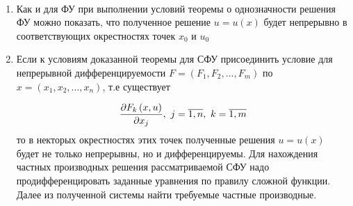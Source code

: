 \documentclass[../../main.tex]{subfiles}
\begin{document}
\begin{rems}

~

    \begin{enumerate}
        \item Как и для ФУ при выполнении условий 
        теоремы о однозначности решения ФУ можно показать,
        что полученное решение $u = u\left(x\right)$
        будет непрерывно в соответствующих окрестностях
        точек $x_0$ и $u_0$
        \item Если к условиям доказанной теоремы для
        СФУ присоединить условие для непрерывной 
        дифференцируемости
        $F = \left(F_1, F_2, ..., F_m\right)$ по
        $x = \left(x_1, x_2, ..., x_n\right)$, т.е 
        существует
        
        \[
        \pderiv{F_k\left(x, u\right)}{x_j},\ 
        j = \overline{1, n},\ k = \overline{1, m}\] то в некторых окрестностях
        этих точек полученные решения 
        $u = u\left(x\right)$ будет не только 
        непрерывны, но и дифференцируемы.
        Для нахождения частных производных решения
        рассматриваемой СФУ надо продифференцировать
        заданные уравнения по правилу сложной функции.
        Далее из полученной системы найти требуемые частные производные. 
    \end{enumerate}
\end{rems}
\end{document}
